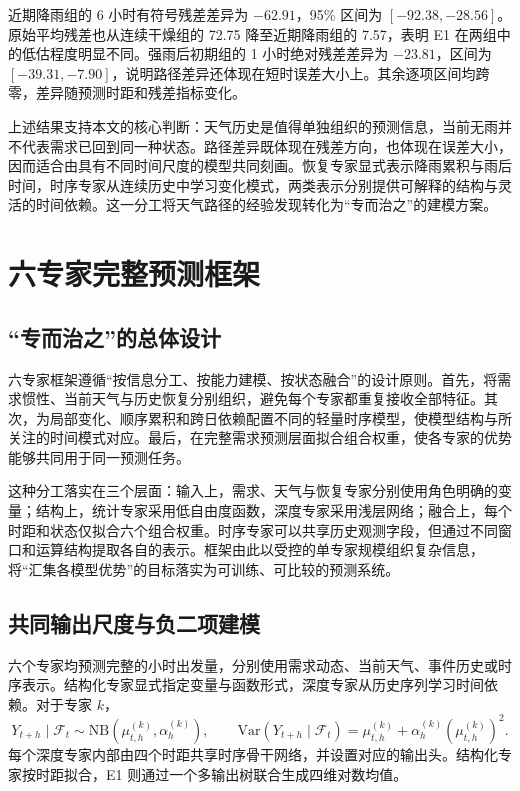 \documentclass[UTF8,11pt,a4paper]{ctexart}
\begin{document}
近期降雨组的 6 小时有符号残差差异为 $-62.91$，95\% 区间为 $[-92.38,-28.56]$。原始平均残差也从连续干燥组的 72.75 降至近期降雨组的 7.57，表明 E1 在两组中的低估程度明显不同。强雨后初期组的 1 小时绝对残差差异为 $-23.81$，区间为 $[-39.31,-7.90]$，说明路径差异还体现在短时误差大小上。其余逐项区间均跨零，差异随预测时距和残差指标变化。

上述结果支持本文的核心判断：天气历史是值得单独组织的预测信息，当前无雨并不代表需求已回到同一种状态。路径差异既体现在残差方向，也体现在误差大小，因而适合由具有不同时间尺度的模型共同刻画。恢复专家显式表示降雨累积与雨后时间，时序专家从连续历史中学习变化模式，两类表示分别提供可解释的结构与灵活的时间依赖。这一分工将天气路径的经验发现转化为“专而治之”的建模方案。

\section{六专家完整预测框架}

\subsection{“专而治之”的总体设计}

六专家框架遵循“按信息分工、按能力建模、按状态融合”的设计原则。首先，将需求惯性、当前天气与历史恢复分别组织，避免每个专家都重复接收全部特征。其次，为局部变化、顺序累积和跨日依赖配置不同的轻量时序模型，使模型结构与所关注的时间模式对应。最后，在完整需求预测层面拟合组合权重，使各专家的优势能够共同用于同一预测任务。

这种分工落实在三个层面：输入上，需求、天气与恢复专家分别使用角色明确的变量；结构上，统计专家采用低自由度函数，深度专家采用浅层网络；融合上，每个时距和状态仅拟合六个组合权重。时序专家可以共享历史观测字段，但通过不同窗口和运算结构提取各自的表示。框架由此以受控的单专家规模组织复杂信息，将“汇集各模型优势”的目标落实为可训练、可比较的预测系统。


\subsection{共同输出尺度与负二项建模}

六个专家均预测完整的小时出发量，分别使用需求动态、当前天气、事件历史或时序表示。结构化专家显式指定变量与函数形式，深度专家从历史序列学习时间依赖。对于专家 $k$，
\begin{equation}
  Y_{t+h}\mid\mathcal{F}_t \sim \mathrm{NB}(\mu^{(k)}_{t,h},\alpha^{(k)}_h),
  \qquad \mathrm{Var}(Y_{t+h}\mid\mathcal{F}_t)=\mu^{(k)}_{t,h}+\alpha^{(k)}_h(\mu^{(k)}_{t,h})^2.
\end{equation}
每个深度专家内部由四个时距共享时序骨干网络，并设置对应的输出头。结构化专家按时距拟合，E1 则通过一个多输出树联合生成四维对数均值。
\end{document}
